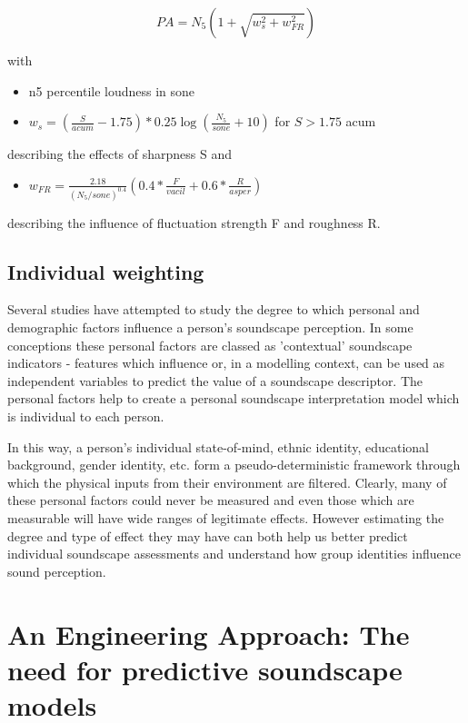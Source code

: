 \begin{equation}
  PA = N_5 ( 1 + \sqrt{w^2_s + w^2_{FR}})
\end{equation}

with 

\begin{itemize}
  \item \gls{n5} percentile loudness in sone
  \item $w_s = (\frac{S}{acum} - 1.75) * 0.25 \log{(\frac{N_5}{sone} + 10)}$ for $S > 1.75$ acum
\end{itemize}

describing the effects of sharpness S and 

\begin{itemize}
  \item $w_{FR} = \frac{2.18}{(N_5/sone)^{0.4}} (0.4 * \frac{F}{vacil} + 0.6 * \frac{R}{asper})$
\end{itemize}

describing the influence of fluctuation strength F and roughness R.


\subsection{Individual weighting}
Several studies have attempted to study the degree to which personal and demographic factors influence a person's soundscape perception. In some conceptions \citep{Kou2020effects,Erfanian2019Psychophysiological} these personal factors are classed as 'contextual' soundscape indicators - features which influence or, in a modelling context, can be used as independent variables to predict the value of a soundscape descriptor. The personal factors help to create a personal soundscape interpretation model which is individual to each person.

In this way, a person's individual state-of-mind, ethnic identity, educational background, gender identity, etc. form a pseudo-deterministic framework %
through which the physical inputs from their environment are filtered. Clearly, many of these personal factors could never be measured and even those which are measurable will have wide ranges of legitimate effects. However estimating the degree and type of effect they may have can both help us better predict individual soundscape assessments and understand how group identities influence sound perception.

\section{An Engineering Approach: The need for predictive soundscape models}
\label{sec:NeedForPredModels}


